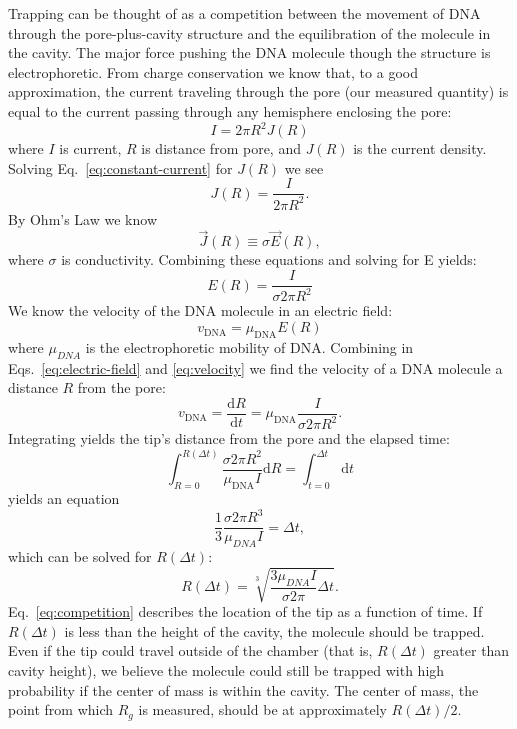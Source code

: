 \documentclass[aps,prl,preprint,groupedaddress]{revtex4}
\begin{document}
Trapping can be thought of as a competition between the movement of DNA through the pore-plus-cavity structure and the equilibration of the molecule in the cavity.
The major force pushing the DNA molecule though the structure is electrophoretic.
From charge conservation we know that, to a good approximation, the current traveling through the pore (our measured quantity) is equal to the current passing through any hemisphere enclosing the pore: 
\begin{equation} I = 2 \pi R^2 J(R) \label{eq:constant-current}\end{equation} 
where \(I\) is current, \(R\) is distance from pore, and \(J(R)\) is the current density.
Solving Eq.~\ref{eq:constant-current} for \(J(R)\) we see 
\[J(R) = \frac{I}{2 \pi R^2}.\] 
By Ohm's Law we know 
\[\overrightarrow{J}(R) \equiv \sigma \overrightarrow{E}(R),\]
where \(\sigma\) is conductivity.
Combining these equations and solving for E yields:
\begin{equation} E(R) = \frac{I}{\sigma 2 \pi R^2} \label{eq:electric-field} \end{equation} 
We know the velocity of the DNA molecule in an electric field: 
\begin{equation} v_{\mathrm{DNA}} = \mu_{\mathrm{DNA}} E(R) \label{eq:velocity} \end{equation} 
where \(\mu_{DNA}\) is the electrophoretic mobility of DNA.
Combining in Eqs.~\ref{eq:electric-field} and \ref{eq:velocity} we find the velocity of a DNA molecule a distance $R$ from the pore:
\begin{equation} v_{\mathrm{DNA}} = \frac{\mathrm{d}R}{\mathrm{d}t} = \mu_{\mathrm{DNA}} \frac{I}{\sigma 2 \pi R^2}. \end{equation}
Integrating yields the tip's distance from the pore and the elapsed time:
\begin{equation}\int_{R=0}^{R(\Delta t)} \frac{\sigma 2 \pi R^2}{\mu_{\mathrm{DNA}} I} \mathrm{d}R = \int_{t=0}^{\Delta t} \mathrm{d}t \end{equation}
yields an equation
\begin{equation}\frac{1}{3} \frac{\sigma 2 \pi R^3}{\mu_{DNA} I} = \Delta t,\end{equation}
which can be solved for \(R(\Delta t)\):
\begin{equation} R(\Delta t) = \sqrt[3]{\frac{3 \mu_{DNA} I}{\sigma 2 \pi}\Delta t} .\label{eq:competition}\end{equation}
Eq.~\ref{eq:competition} describes the location of the tip as a function of time.
If \(R(\Delta t)\) is less than the height of the cavity, the molecule should be trapped.
Even if the tip could travel outside of the chamber (that is, \(R(\Delta t)\) greater than cavity height), we believe the molecule could still be trapped with high probability if the center of mass is within the cavity.
The center of mass, the point from which \(R_g\) is measured, should be at approximately \(R(\Delta t)/2\).
\end{document}
